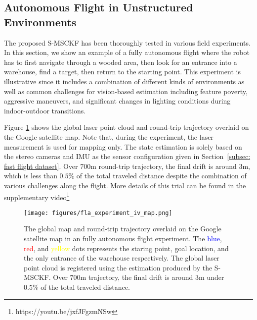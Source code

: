 \subsection{Autonomous Flight in Unstructured Environments}
\label{subsec: fla field test}
The proposed S-MSCKF has been thoroughly tested in various field experiments. In this section, we show an example of a fully autonomous flight where the robot has to first navigate through a wooded area, then look for an entrance into a warehouse, find a target, then return to the starting point. This experiment is illustrative since it includes a combination of different kinds of environments as well as common challenges for vision-based estimation including feature poverty, aggressive maneuvers, and significant changes in lighting conditions during indoor-outdoor transitions. 

Figure \ref{fig: fla experiment iv} shows the global laser point cloud and round-trip trajectory overlaid on the Google satellite map.  Note that, during the experiment, the laser measurement is used for mapping only. The state estimation is solely based on the stereo cameras and IMU as the sensor configuration given in Section~\ref{subsec: fast flight dataset}. Over $700$m round-trip trajectory, the final drift is around $3$m, which is less than $0.5\%$ of the total traveled distance despite the combination of various challenges along the flight. More details of this trial can be found in the supplementary video\footnote{https://youtu.be/jxfJFgzmNSw}

\begin{figure}[htp]
\centering
\texttt{[image: figures/fla\_experiment\_iv\_map.png]}
\caption{The global map and round-trip trajectory overlaid on the Google satellite map in an fully autonomous flight experiment. The \textcolor{blue}{blue}, \textcolor{red}{red}, and \textcolor{yellow}{yellow} dots represents the staring point, goal location, and the only entrance of the warehouse respectively. The global laser point cloud is registered using the estimation produced by the S-MSCKF. Over $700$m trajectory, the final drift is around $3$m under $0.5\%$ of the total traveled distance.}
\label{fig: fla experiment iv}
\end{figure}